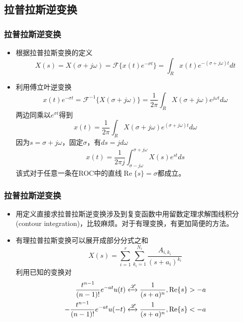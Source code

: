 \documentclass[CJKutf8,dvipsnames,table]{beamer}
\begin{document}
\begin{CJK*}{UTF8}{song}
  \section{拉普拉斯逆变换}
  
  \begin{frame}
    \frametitle{拉普拉斯逆变换}
    \begin{itemize}
    \item 根据拉普拉斯变换的定义
	\[
    	X(s) = X(\sigma + j\omega) = \mathscr{F}\{ x(t) e^{-\sigma t} \}
	         = \int_R x(t)e^{-(\sigma + j\omega)t}dt 
	\]
	\item 利用傅立叶逆变换
	\[
    	x(t) e^{-\sigma t} = \mathscr{F}^{-1}\{ X(\sigma + j\omega) \}   
	                       = \frac{1}{2\pi}\int_R X(\sigma + j\omega)e^{j\omega t}d\omega 
	\]
	两边同乘以$e^{\sigma t}$得到
	\[
		x(t) = \frac{1}{2\pi}\int_R X(\sigma + j\omega)e^{(\sigma+j\omega) t}d\omega 
	\]
	因为$s=\sigma+j\omega$，固定$\sigma$，有$ds=jd\omega$
	\[
		x(t) = \frac{1}{2\pi j}\int_{\sigma-j\omega}^{\sigma+j\omega} X(s)e^{st}ds 	
	\]
	该式对于任意一条在ROC中的直线$\operatorname{Re}\{s\}=\sigma$都成立。
    \end{itemize}
  \end{frame}   

  \begin{frame}
    \frametitle{拉普拉斯逆变换}
    \begin{itemize}
    \item 用定义直接求拉普拉斯逆变换涉及到复变函数中用留数定理求解围线积分(contour integration)，比较麻烦。对于有理变换，有更加简便的方法。
	\item 有理拉普拉斯变换可以展开成部分分式之和
	\[
		X(s) = \sum_{i=1}^{r} \sum_{k_i=1}^{N_i} \frac{A_{i,k_i}}{(s+a_i)^{k_i}}
	\]
	利用已知的变换对
	\begin{align*}
		\frac{t^{n-1}}{(n-1)!}e^{-at}u(t) & \xleftrightarrow{\mathscr{L}} \frac{1}{(s+a)^n}, \operatorname{Re}\{s\} > -a \\
		-\frac{t^{n-1}}{(n-1)!}e^{-at}u(-t) & \xleftrightarrow{\mathscr{L}} \frac{1}{(s+a)^n}, \operatorname{Re}\{s\} < -a
	\end{align*}
    \end{itemize}
  \end{frame}   
    

\end{CJK*}
\end{document}
